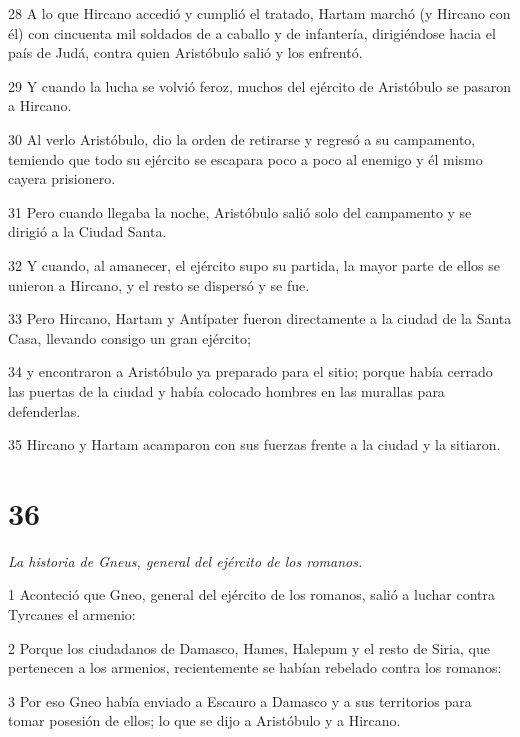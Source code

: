 \par 28 A lo que Hircano accedió y cumplió el tratado, Hartam marchó (y Hircano con él) con cincuenta mil soldados de a caballo y de infantería, dirigiéndose hacia el país de Judá, contra quien Aristóbulo salió y los enfrentó.

\par 29 Y cuando la lucha se volvió feroz, muchos del ejército de Aristóbulo se pasaron a Hircano.

\par 30 Al verlo Aristóbulo, dio la orden de retirarse y regresó a su campamento, temiendo que todo su ejército se escapara poco a poco al enemigo y él mismo cayera prisionero.

\par 31 Pero cuando llegaba la noche, Aristóbulo salió solo del campamento y se dirigió a la Ciudad Santa.

\par 32 Y cuando, al amanecer, el ejército supo su partida, la mayor parte de ellos se unieron a Hircano, y el resto se dispersó y se fue.

\par 33 Pero Hircano, Hartam y Antípater fueron directamente a la ciudad de la Santa Casa, llevando consigo un gran ejército;

\par 34 y encontraron a Aristóbulo ya preparado para el sitio; porque había cerrado las puertas de la ciudad y había colocado hombres en las murallas para defenderlas.

\par 35 Hircano y Hartam acamparon con sus fuerzas frente a la ciudad y la sitiaron.


\chapter{36}

\par \textit{La historia de Gneus, general del ejército de los romanos.}

\par 1 Aconteció que Gneo, general del ejército de los romanos, salió a luchar contra Tyrcanes el armenio:

\par 2 Porque los ciudadanos de Damasco, Hames, Halepum y el resto de Siria, que pertenecen a los armenios, recientemente se habían rebelado contra los romanos:

\par 3 Por eso Gneo había enviado a Escauro a Damasco y a sus territorios para tomar posesión de ellos; lo que se dijo a Aristóbulo y a Hircano.

